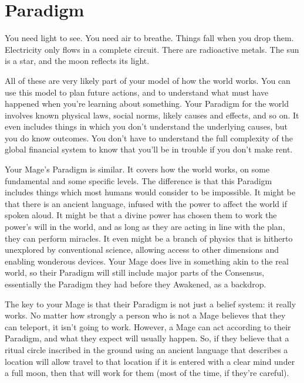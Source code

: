 \documentclass[
  oneside,
  statementpaper,
  9pt]{memoir}
\begin{document}
\hypertarget{paradigm-1}{%
\section{Paradigm}\label{paradigm-1}}

\begin{Player}

You need light to see. You need air to breathe. Things fall when you drop them. Electricity only flows in a complete circuit. There are radioactive metals. The sun is a star, and the moon reflects its light.

All of these are very likely part of your model of how the world works. You can use this model to plan future actions, and to understand what must have happened when you’re learning about something. Your Paradigm for the world involves known physical laws, social norms, likely causes and effects, and so on. It even includes things in which you don’t understand the underlying causes, but you do know outcomes. You don’t have to understand the full complexity of the global financial system to know that you’ll be in trouble if you don’t make rent.

Your Mage’s Paradigm is similar. It covers how the world works, on some fundamental and some specific levels. The difference is that this Paradigm includes things which most humans would consider to be impossible. It might be that there is an ancient language, infused with the power to affect the world if spoken aloud. It might be that a divine power has chosen them to work the power’s will in the world, and as long as they are acting in line with the plan, they can perform miracles. It even might be a branch of physics that is hitherto unexplored by conventional science, allowing access to other dimensions and enabling wonderous devices. Your Mage does live in something akin to the real world, so their Paradigm will still include major parts of the Consensus, essentially the Paradigm they had before they Awakened, as a backdrop.

The key to your Mage is that their Paradigm is not just a belief system: it really works. No matter how strongly a person who is not a Mage believes that they can teleport, it isn’t going to work. However, a Mage can act according to their Paradigm, and what they expect will usually happen. So, if they believe that a ritual circle inscribed in the ground using an ancient language that describes a location will allow travel to that location if it is entered with a clear mind under a full moon, then that will work for them (most of the time, if they’re careful).


\end{Player}
\end{document}
